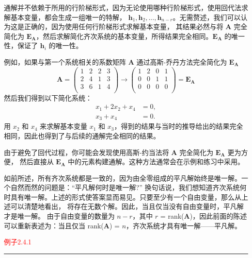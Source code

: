 通解并不依赖于所用的行阶梯形式，因为无论使用哪种行阶梯形式，使用回代法求解基本变量，都会生成一组唯一的特解，
{\(\mathbf{h}_1, \mathbf{h}_2, ..., \mathbf{h}_{n-r}\)}。无需赘述，我们可以认为这是正确的，因为使用任何行阶梯形式求解基本变量，
其结果必然与将 \(\mathbf{A}\) 完全简化为 \(\mathbf{E_A}\)，然后求解简化齐次系统的基本变量，所得结果完全相同。\(\mathbf{E_A}\) 的唯一性，保证了 \(\mathbf{h}_i\) 的唯一性。

例如，如果与第一个系统相关的系数矩阵 \(\mathbf{A}\) 通过高斯-乔丹方法完全简化为 \(\mathbf{E_A}\)
\[
\mathbf{A} = 
\left(\begin{array}{cccc}
    1 & 2 & 2 & 3 \\
    2 & 4 & 1 & 3 \\
    3 & 6 & 1 & 4 \\
\end{array}\right)\to
\left(\begin{array}{cccc}
    1 & 2 & 0 & 1 \\
    0 & 0 & 1 & 1 \\
    0 & 0 & 0 & 0 \\
\end{array}\right)= \mathbf{E_A}
\]
然后我们得到以下简化系统：
\[
\begin{aligned}
    x_1 + 2x_2 + x_4 &= 0, \\
    x_3 + x_4 &= 0.
\end{aligned}
\]
用 \(x_2\) 和 \(x_4\) 来求解基本变量 \(x_1\) 和 \(x_3\)，得到的结果与当时的推导给出的结果完全相同，因此也得到了与后续的通解完全相同的结果。

由于避免了回代过程，你可能会发现使用高斯-约当法将 \(\mathbf{A}\) 完全简化为 \(\mathbf{E_A}\) 更为方便，
然后直接从 \(\mathbf{E_A}\) 中的元素构建通解。这种方法通常会在示例和练习中采用。

如前所述，所有齐次系统都是一致的，因为由全零组成的平凡解始终是唯一解。一个自然而然的问题是：“平凡解何时是唯一解?”
换句话说，我们想知道齐次系统何时具有唯一解。上述的形式使答案显而易见。只要至少有一个自由变量，那么从上述可以清楚地看出，
将存在无数个解。因此，当且仅当没有自由变量时，平凡解才是唯一解。
由于自由变量的数量为 \(n - r\)，其中 \(r\) = rank(\(\mathbf{A}\))，因此前面的陈述可以重新表述为：当且仅当 rank(\(\mathbf{A}\)) = \(n\)，齐次系统才具有唯一解——平凡解。

\textcolor{red}{例子2.4.1}
\color{red}\rule{\textwidth}{0.4pt}\color{black}

